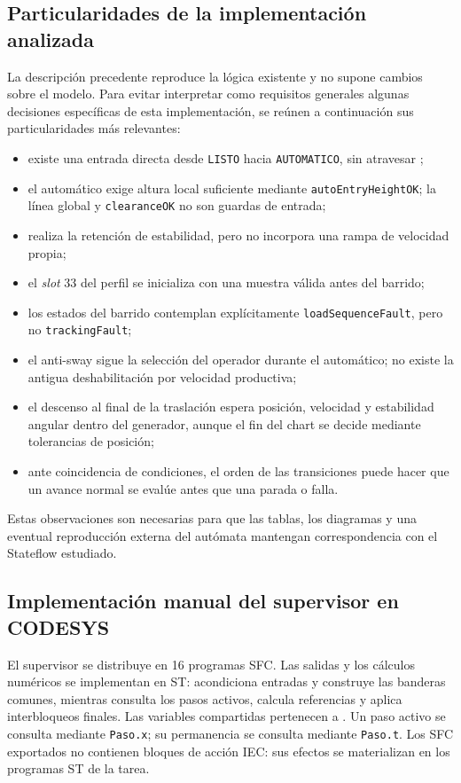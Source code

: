 \documentclass[a4paper,10pt,onecolumn,journal]{ieeeconf}
\numberwithin{equation}{section}
\begin{document}
\subsection{Particularidades de la implementación analizada}
La descripción precedente reproduce la lógica existente y no supone cambios sobre el modelo. Para evitar interpretar como requisitos generales algunas decisiones específicas de esta implementación, se reúnen a continuación sus particularidades más relevantes:
\begin{itemize}
    \item existe una entrada directa desde \texttt{LISTO} hacia \texttt{AUTOMATICO}, sin atravesar ;
    \item el automático exige altura local suficiente mediante \texttt{autoEntryHeightOK}; la línea global y \texttt{clearanceOK} no son guardas de entrada;
    \item {} realiza la retención de estabilidad, pero no incorpora una rampa de velocidad propia;
    \item el \textit{slot} 33 del perfil se inicializa con una muestra válida antes del barrido;
    \item los estados del barrido contemplan explícitamente \texttt{loadSequenceFault}, pero no \texttt{trackingFault};
    \item el anti-sway sigue la selección del operador durante el automático; no existe la antigua deshabilitación por velocidad productiva;
    \item el descenso al final de la traslación espera posición, velocidad y estabilidad angular dentro del generador, aunque el fin del chart se decide mediante tolerancias de posición;
    \item ante coincidencia de condiciones, el orden de las transiciones puede hacer que un avance normal se evalúe antes que una parada o falla.
\end{itemize}
Estas observaciones son necesarias para que las tablas, los diagramas y una eventual reproducción externa del autómata mantengan correspondencia con el Stateflow estudiado.



\subsection{Implementación manual del supervisor en CODESYS}
El supervisor se distribuye en 16 programas SFC. Las salidas y los cálculos numéricos se implementan en ST:  acondiciona entradas y construye las banderas comunes, mientras  consulta los pasos activos, calcula referencias y aplica interbloqueos finales. Las variables compartidas pertenecen a . Un paso activo se consulta mediante \texttt{Paso.x}; su permanencia se consulta mediante \texttt{Paso.t}. Los SFC exportados no contienen bloques de acción IEC: sus efectos se materializan en los programas ST de la tarea.
\end{document}
